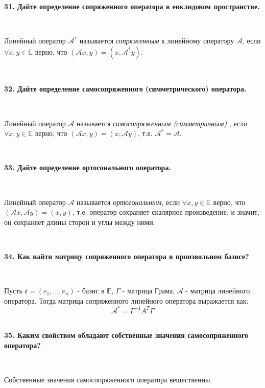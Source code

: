 \documentclass{article}
\begin{document}
	\textbf{31. Дайте определение сопряженного оператора в евклидовом пространстве.}
	
	{
		$\;$
		\setlength{\parindent}{0.4cm}
		\hangindent=0.4cm
		
		Линейный оператор $\mathcal{A}^*$ называется \textit{сопряженным} к линейному оператору $\mathcal{A}$, если $\forall x, y \in \mathbb{E}$ верно, что $(\mathcal{A}x, y)= (x, \mathcal{A}^*y).$
		
		$\;$
		\setlength{\parindent}{0cm}
		\hangindent=0cm
	}

	\textbf{32. Дайте определение самосопряженного (симметрического) оператора.}
	
	{
		$\;$
		\setlength{\parindent}{0.4cm}
		\hangindent=0.4cm
		
		Линейный оператор $\mathcal{A}$ называется \textit{самосопряженным (симметричным) }, если $\forall x, y \in \mathbb{E}$ верно, что $(\mathcal{A}x, y)= (x, \mathcal{A}y)$, т.е. $\mathcal{A}^*=\mathcal{A}$.
		
		$\;$
		\setlength{\parindent}{0cm}
		\hangindent=0cm
	}

	\textbf{33. Дайте определение ортогонального оператора.}
	
	{
		$\;$
		\setlength{\parindent}{0.4cm}
		\hangindent=0.4cm
		
		Линейный оператор $\mathcal{A}$ называется \textit{ортогональным}, если $\forall x, y \in \mathbb{E}$ верно, что $(\mathcal{A}x, \mathcal{A}y)= (x, y)$, т.е. оператор сохраняет скалярное произведение, и значит, он сохраняет длины сторон и углы между ними.
		
		$\;$
		\setlength{\parindent}{0cm}
		\hangindent=0cm
	}


	\textbf{34. Как найти матрицу сопряженного оператора в произвольном базисе?}
	
	{
		$\;$
		\setlength{\parindent}{0.4cm}
		\hangindent=0.4cm
		
		Пусть $\mathfrak{e} = (e_1,\dots,e_n)$ - базис в $\mathbb{E}$, $\Gamma$ - матрица Грама, $\mathcal{A}$ - матрица линейного оператора. Тогда матрица сопряженного линейного оператора выражается как:
		$$
		\mathcal{A}^*=\Gamma^{-1}A^T \Gamma
		$$
		$\;$
		\setlength{\parindent}{0cm}
		\hangindent=0cm
	}

	\textbf{35. Каким свойством обладают собственные значения самосопряженного оператора?}
	
	{
		$\;$
		\setlength{\parindent}{0.4cm}
		\hangindent=0.4cm
		
		Собственные значения самосопряженного оператора вещественны.
		
		$\;$
		\setlength{\parindent}{0cm}
		\hangindent=0cm
	}
\end{document}
